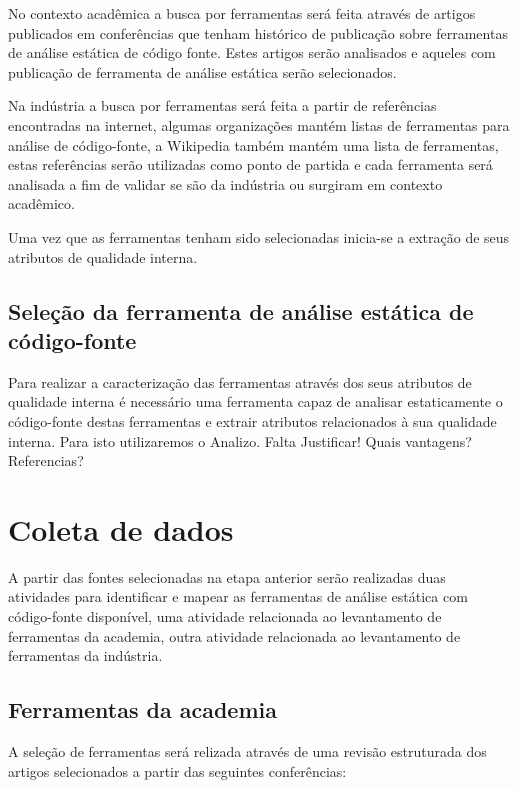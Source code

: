 \documentclass[qual, classic, a4paper]{ufbathesis}
\begin{document}
No contexto acadêmica a busca por ferramentas será feita
através de artigos publicados em conferências que tenham histórico de
publicação sobre ferramentas de análise estática de código fonte. Estes
artigos serão analisados e aqueles com publicação de ferramenta de análise
estática serão selecionados.

Na indústria a busca por ferramentas será feita a partir
de referências encontradas na internet, algumas organizações mantém listas de
ferramentas para análise de código-fonte, a Wikipedia também mantém uma lista
de ferramentas, estas referências serão utilizadas como ponto de partida e
cada ferramenta será analisada a fim de validar se são da indústria ou
surgiram em contexto acadêmico.

Uma vez que as ferramentas tenham sido selecionadas inicia-se a extração de
seus atributos de qualidade interna.

\subsection{Seleção da ferramenta de análise estática de código-fonte}

Para realizar a caracterização das ferramentas através dos seus atributos de
qualidade interna é necessário uma ferramenta capaz de analisar estaticamente
o código-fonte destas ferramentas e extrair atributos relacionados à sua
qualidade interna. Para isto utilizaremos o Analizo\cite{Terceiro2010}. Falta
Justificar! Quais vantagens? Referencias?

\section{Coleta de dados}

A partir das fontes selecionadas na etapa anterior serão realizadas duas
atividades para identificar e mapear as ferramentas de análise estática com
código-fonte disponível, uma atividade relacionada ao levantamento de
ferramentas da academia, outra atividade relacionada ao levantamento de
ferramentas da indústria.

\subsection{Ferramentas da academia}

A seleção de ferramentas será relizada através de uma revisão estruturada dos
artigos selecionados a partir das seguintes conferências:
\end{document}
